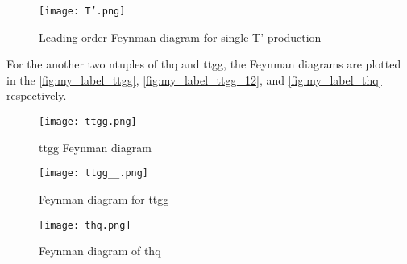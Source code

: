 \begin{figure}[H]
    \centering
    \texttt{[image: T'.png]}
    \caption{Leading-order Feynman diagram for single T’ production}
    \label{fig:my_label_T'}
\end{figure}





For the another two ntuples of thq and ttgg, the Feynman diagrams are plotted in the  \autoref{fig:my_label_ttgg}, \autoref{fig:my_label_ttgg_12}, and \autoref{fig:my_label_thq}  respectively.

\begin{figure}[H]
    \centering
    \texttt{[image: ttgg.png]}
    \caption{ttgg Feynman diagram}
    \label{fig:my_label_ttgg}
\end{figure}

\begin{figure}[H]
    \centering
    \texttt{[image: ttgg\_\_.png]}
    \caption{Feynman diagram for ttgg}
    \label{fig:my_label_ttgg_12}
\end{figure}




\begin{figure}[H]
    \centering
    \texttt{[image: thq.png]}
    \caption{Feynman diagram of thq}
    \label{fig:my_label_thq}
\end{figure}




